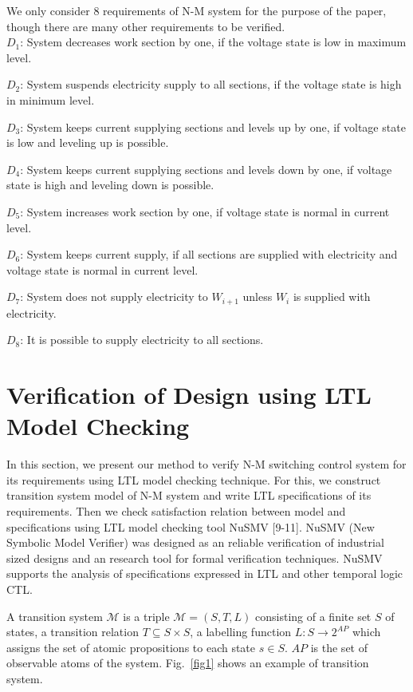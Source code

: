 \documentclass[runningheads,a4paper]{llncs}
\begin{document}
We only consider 8 requirements of N-M system for the purpose of the paper, though there are many other requirements to be verified. \\

$D_1$: System decreases work section by one, if the voltage state is low in maximum level.

$D_2$: System suspends electricity supply to all sections, if the voltage state is high in minimum level. 

$D_3$: System keeps current supplying sections and levels up by one, if voltage state is low and leveling up is possible. 

$D_4$: System keeps current supplying sections and levels down by one, if voltage state is high and leveling down is possible.

$D_5$: System increases work section by one, if voltage state is normal in current level.

$D_6$: System keeps current supply, if all sections are supplied with electricity and voltage state is normal in current level. 

$D_7$: System does not supply electricity to $W_{i+1}$ unless $W_i$ is supplied with electricity.

$D_8$: It is possible to supply electricity to all sections. 

\section{Verification of Design using LTL Model Checking}

In this section, we present our method to verify N-M switching control system for its requirements using LTL model checking technique. For this, we construct transition system model of N-M system and write LTL specifications of its requirements. Then we check satisfaction relation between model and specifications using LTL model checking tool NuSMV [9-11]. NuSMV (New Symbolic Model Verifier) was designed as an reliable verification of industrial sized designs and an research tool for formal verification techniques. NuSMV supports the analysis of specifications expressed in LTL and other temporal logic CTL. 

A transition system $\mathcal{M}$ is a triple $\mathcal{M}=(S, T, L)$ consisting of a finite set $S$ of states, a transition relation $T\subseteq S\times S$, a labelling function $L:S\rightarrow 2^{AP}$ which assigns the set of atomic propositions to each state $s \in S$. $AP$ is the set of observable atoms of the system. Fig.~\ref{fig1} shows an example of transition system.
\end{document}
